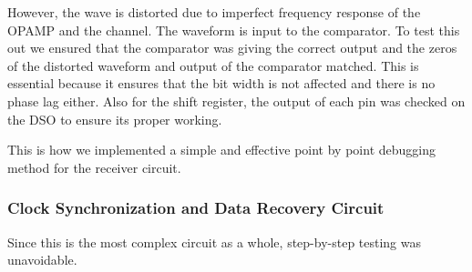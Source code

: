 \documentclass{article}
\begin{document}
However, the wave is distorted due to imperfect frequency response of the OPAMP and the channel. The waveform is input to the comparator. To test this out we ensured that the comparator was giving the correct output and the zeros of the distorted waveform and output of the comparator matched. This is essential because it ensures that the bit width is not affected and there is no phase lag either. Also for the shift register, the output of each pin was checked on the DSO to ensure its proper working.

This is how we implemented a simple and effective point by point debugging method for the receiver circuit.


\subsubsection{Clock Synchronization and Data Recovery Circuit}
Since this is the most complex circuit as a whole, step-by-step testing was unavoidable.
\end{document}
